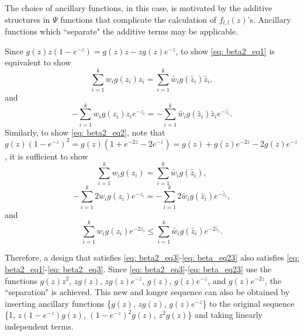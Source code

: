 \documentclass[12pt]{amsart}
\theoremstyle{definition}
\theoremstyle{remark}
\numberwithin{equation}{section}
\begin{document}
The choice of ancillary functions, in this case, is motivated by the additive structures in $\Psi$ functions that complicate the calculation of $f_{l,l}(z)$'s. Ancillary functions which ``separate" the additive terms may be applicable. 

Since $g(z)z(1-e^{-z}) = g(z)z-zg(z)e^{-z}$, to show \eqref{eq: beta2_eq1} is equivalent to show 
\begin{equation}\label{eq: beta_eq11}
\sum_{i=1}^{k} w_i g(z_i)z_i = \sum_{i=1}^{k} \tilde{w_i}  g(\tilde{z_i})\tilde{z_i},\end{equation} 
and  
\begin{equation}\label{eq: beta_eq12}
-\sum_{i=1}^{k} w_i  g(z_i)z_ie^{-z_i} = -\sum_{i=1}^{k} \tilde{w_i} g(\tilde{z_i}) \tilde{z_i}e^{-\tilde{z_i}}.\end{equation} Similarly, to show \eqref{eq: beta2_eq2}, note that $g(z)(1-e^{-z})^2 = g(z)(1+e^{-2z}-2e^{-z}) = g(z)+g(z)e^{-2z}-2g(z)e^{-z}$, it is sufficient to show 
\begin{equation}\label{eq: beta_eq21}
\sum_{i=1}^{k} w_i g(z_i) = \sum_{i=1}^{k} \tilde{w_i}  g(\tilde{z_i}),\end{equation}
\begin{equation}\label{eq: beta_eq22}
-\sum_{i=1}^{k}2 w_i  g(z_i)e^{-z_i} = -\sum_{i=1}^{k}2 \tilde{w_i} g(\tilde{z_i}) e^{-\tilde{z_i}},
\end{equation}
and
\begin{equation}\label{eq: beta_eq23}
\sum_{i=1}^{k} w_i g(z_i)e^{-2z_i} \le \sum_{i=1}^{k} \tilde{w_i}g(\tilde{z_i})e^{-2\tilde{z_i}}.
\end{equation}


Therefore, a design that satisfies \eqref{eq: beta2_eq3}-\eqref{eq: beta_eq23} also satisfies \eqref{eq: beta2_eq1}-\eqref{eq: beta2_eq3}. Since \eqref{eq: beta2_eq3}-\eqref{eq: beta_eq23} use the functions $g(z)z^2$, $zg(z)$, $zg(z)e^{-z}$, $g(z)$, $g(z)e^{-z}$, and $g(z)e^{-2z}$, the ``separation" is achieved. This new and longer sequence can also be obtained by inserting ancillary functions \{$g(z)$, $zg(z)$, $g(z)e^{-z}$\} to the original sequence \{1,  $z(1-e^{-z})g(z)$,  $(1-e^{-z})^2g(z)$, $z^2g(z)$\} and taking linearly independent terms.
\end{document}
